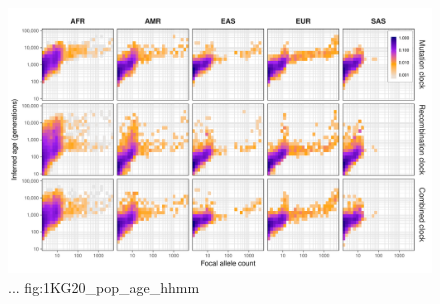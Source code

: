 

\begin{figure}[!htb]
\centering
\includegraphics[width=\textwidth]{./img/ch5/1KG20_pop_age_hhmm}
%
{...}%
{fig:1KG20_pop_age_hhmm}
\end{figure}
